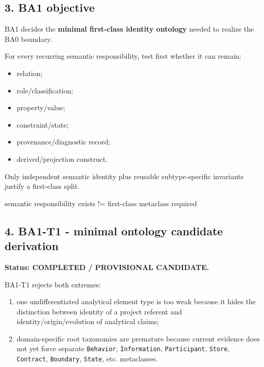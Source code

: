 \documentclass[
]{article}
\newenvironment{Shaded}{}{}
\newcommand{\NormalTok}[1]{#1}
\providecommand{\tightlist}{%
  \setlength{\itemsep}{0pt}\setlength{\parskip}{0pt}}
\begin{document}
\subsection{3. BA1 objective}\label{3-ba1-objective}

BA1 decides the \textbf{minimal first-class identity ontology} needed to
realize the BA0 boundary.

For every recurring semantic responsibility, test first whether it can
remain:

\begin{itemize}
\tightlist
\item
  relation;
\item
  role/classification;
\item
  property/value;
\item
  constraint/state;
\item
  provenance/diagnostic record;
\item
  derived/projection construct.
\end{itemize}

Only independent semantic identity plus reusable subtype-specific
invariants justify a first-class split.

\begin{Shaded}
\begin{Highlighting}[]
\NormalTok{semantic responsibility exists}
\NormalTok{        !=}
\NormalTok{first{-}class metaclass required}
\end{Highlighting}
\end{Shaded}

\subsection{4. BA1-T1 - minimal ontology candidate
derivation}\label{4-ba1-t1---minimal-ontology-candidate-derivation}

\textbf{Status: COMPLETED / PROVISIONAL CANDIDATE.}

BA1-T1 rejects both extremes:

\begin{enumerate}
\def\labelenumi{\arabic{enumi}.}
\tightlist
\item
  one undifferentiated analytical element type is too weak because it
  hides the distinction between identity of a project referent and
  identity/origin/evolution of analytical claims;
\item
  domain-specific root taxonomies are premature because current evidence
  does not yet force separate \texttt{Behavior}, \texttt{Information},
  \texttt{Participant}, \texttt{Store}, \texttt{Contract},
  \texttt{Boundary}, \texttt{State}, etc. metaclasses.
\end{enumerate}
\end{document}
